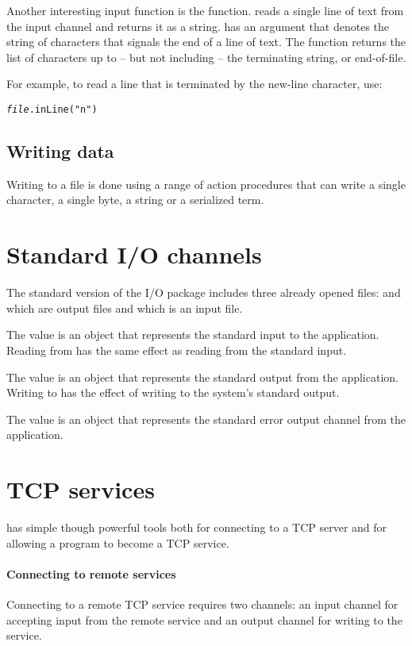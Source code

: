 Another interesting input function is the  function.  reads a single line of text from the input channel and returns it as a string.  has an argument that denotes the string of characters that signals the end of a line of text. The function returns the list of characters up to -- but not including -- the terminating string, or end-of-file.

For example, to read a line that is terminated by the new-line character, use:
\begin{alltt}
\emph{file}.inLine("\bsl{}n")
\end{alltt}

\subsection{Writing data}
\label{io:writing}

Writing to a file is done using a range of action procedures that can write a single character, a single byte, a string or a serialized term.

\section{Standard I/O channels}
\label{io:standard}
The standard version of the I/O package includes three already opened files:  and  which are output files and  which is an input file. 

The  value is an  object that represents the standard input to the \go application. Reading from  has the same effect as reading from the standard input.

The  value is an  object that represents the standard output from the \go application. Writing to  has the effect of writing to the system's standard output.

The  value is an  object that represents the standard error output channel from the \go application. 

\section{TCP services}
\label{io:tcp}

\go has simple though powerful tools both for connecting to a TCP server and for allowing a \go program to become a TCP service.

\paragraph{Connecting to remote services}
Connecting to a remote TCP service requires two channels: an input channel for accepting input from the remote service and an output channel for writing to the service.

